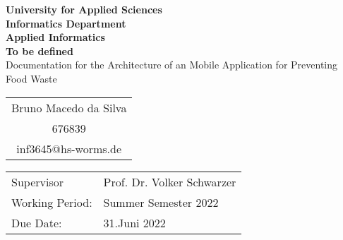 \begin{titlepage}
    \vspace*{2mm}
    \begin{center}
        \Large
        \textbf{University for Applied Sciences}\\
        \textbf{Informatics Department}\\
        \textbf{Applied Informatics}\\
        \vspace{2cm}
        \textbf{To be defined}\\
        \vspace{2cm}
        \large
        Documentation for the Architecture of an Mobile Application for Preventing Food Waste\\
        \vspace{4cm}
        \begin {table}[ht]
            \centering
            \begin{tabular}{c}
                Bruno Macedo da Silva    \\ 
                676839                   \\
                inf3645@hs-worms.de      \\
            \end{tabular}
        \end {table}
        \vspace{2cm}
        \large
        \vspace{2cm}
         \begin {table}[ht]
             \centering
             \begin{tabular}{l l}
                Supervisor         & Prof. Dr. Volker Schwarzer \\
                Working Period:    & Summer Semester 2022 \\
                Due Date:          & 31.Juni 2022 \\
             \end{tabular}
         \end {table}
    \end{center}
    \normalsize
    \vfill
 


\end{titlepage}